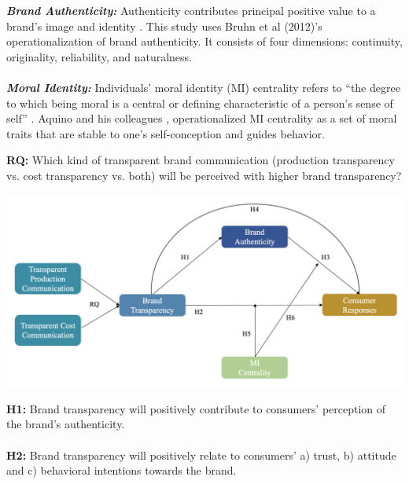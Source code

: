 \documentclass[a0,portrait]{a0poster}
\begin{document}
\begin{minipage}[c]{\linewidth}
\begin{framed}
\begin{multicols}{2}
  \color{Maroon} \textbf{\emph{Brand Authenticity:}} \color{Black} Authenticity contributes principal positive value to a brand's image \autocite{keller_strategic_1998}\autocite{ballantyne_evolution_2006}  and identity \autocite{beverland_crafting_2005}\autocite{kapferer_new_2008}. 
  This study uses Bruhn et al (2012)'s operationalization of brand authenticity. It consists of four dimensions: continuity, originality, reliability, and naturalness.
\\ 
\\
    \color{Maroon} \textbf{\emph{Moral Identity:}} \color{Black}Individuals’ moral identity (MI) centrality refers to “the degree to which being moral is a central or defining characteristic of a person’s sense of self” \autocite{blasi_moral_1994}.
    Aquino and his colleagues \autocite{aquino_self-importance_2002}\autocite{aquino_testing_2009}, operationalized MI centrality as a set of moral traits that are stable to one’s self-conception and guides behavior. 
    \\
   \begin{center}
  \color{Maroon} \textbf{RQ:} \color{Black}  Which kind of transparent brand communication (production transparency vs. cost transparency vs. both) will be perceived with higher brand transparency? \\
  \end{center}
\begin{center}
\includegraphics[width=0.9\linewidth]{figures/Figure1}
\label{ALICerros}
\end{center}
\color{Maroon}
\textbf{H1:} \color{Black}Brand transparency will positively contribute to consumers' perception of the brand's authenticity. \\
\\
\color{Maroon}
\textbf{H2:} \color{Black} Brand transparency will positively relate to consumers’ a) trust, b) attitude and c) behavioral intentions towards the brand.\\

\end{multicols}
\end{framed}
\end{minipage}
\end{document}
